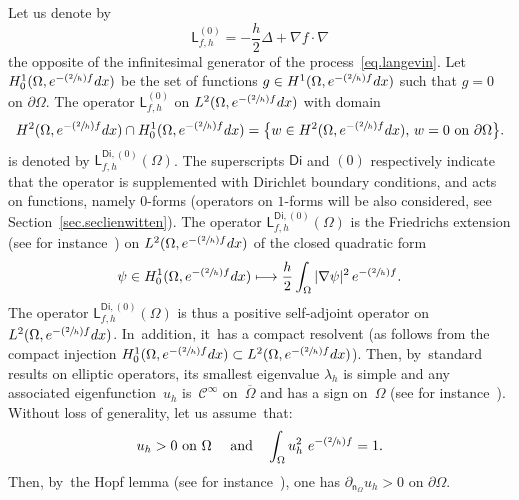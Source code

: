 \documentclass[10pt]{amsart}
\newcommand{\Psfrac}[2]{(\sfrac{#1}{#2})}
\newcommand\mto{\mathchoice{\longmapsto}{\mapsto}{\mapsto}{\mapsto}}
\newcommand{\quand}{\quad\text{and}\quad}
\theoremstyle{plain}
\theoremstyle{definition}
\begin{document}
Let us denote by
\begin{equation}\label{eq:inf_gen}
\mathsf L_{f,h}^{(0)} =-\frac h2 \Delta+\nabla f\cdot \nabla
\end{equation}
the opposite of the infinitesimal generator of the process~\eqref{eq.langevin}.
Let $ H^1_0(\Omega, e^{-\Psfrac 2hf}dx)$ be the set of functions $g\in H^1(\Omega, e^{-\Psfrac 2hf}dx)$ such that $g=0$ on $\partial \Omega$.
The operator $ \mathsf L_{f,h}^{(0)}$ on $L^2(\Omega, e^{-\Psfrac 2h f}dx)$ with domain
\[
H^2(\Omega, e^{-\Psfrac 2h f}dx)\cap H^1_0(\Omega, e^{-\Psfrac 2h f}dx)=\big \{w\in H^2(\Omega, e^{-\Psfrac 2h f}dx), \, w=0 \text{ on } \partial \Omega \big\}.
\]
is denoted by $ \mathsf L^{\mathsf{Di},(0)}_{f,h}(\Omega)$. The
superscripts $\mathsf{Di}$ and $(0)$ respectively indicate that the
operator is supplemented with Dirichlet
boundary conditions, and acts on functions, namely $0$-forms (operators on $1$-forms will be also considered, see Section~\ref{sec.seclienwitten}).
The operator $ \mathsf L^{\mathsf{Di},(0)}_{f,h}(\Omega) $ is the Friedrichs extension (see for instance~\cite[\S4.3]{helffer2013spectral}) on $L^2(\Omega, e^{-\Psfrac 2hf}dx)$ of the closed quadratic form
\begin{equation}\label{eq.Q}
\psi \in H^1_0(\Omega, e^{-\Psfrac 2hf}dx)\mto \frac h2 \int_\Omega \vert \nabla \psi \vert^2\, e^{-\Psfrac 2hf}.
\end{equation}
The operator $ \mathsf L^{\mathsf{Di},(0)}_{f,h}(\Omega)$ is thus a
positive self-adjoint operator on $L^2(\Omega, e^{-\Psfrac 2h
f}dx)$. In~addition, it~has a compact resolvent (as follows from the compact
injection $H^1_0(\Omega, e^{-\Psfrac 2h f}dx)\subset L^2(\Omega, e^{-\Psfrac 2h f}dx)$).
Then, by~standard results on elliptic operators, its smallest eigenvalue $ \lambda_{h}$ is simple and any associated eigenfunction~$u_{h}$ is~$\mathcal C^\infty$ on~$\overline \Omega$ and has a sign on~$\Omega$ (see for instance~\cite[\S\S6.3 \&~6.5]{Eva}).
Without \label{page.lambdah}
loss of
generality, let us assume~that:
\begin{equation}\label{eq.u_norma0}
u_h > 0 \text{ on } \Omega \ \quand \int_{\Omega} u_h^2\ e^{-\Psfrac{2}{h}f} =1.
\end{equation}
Then, by~the Hopf lemma (see for instance~\cite[\S 6.4.2]{Eva}), one has $\partial_{\mathsf n_\Omega}u_h>0$ on $\partial
\Omega$.
\end{document}
